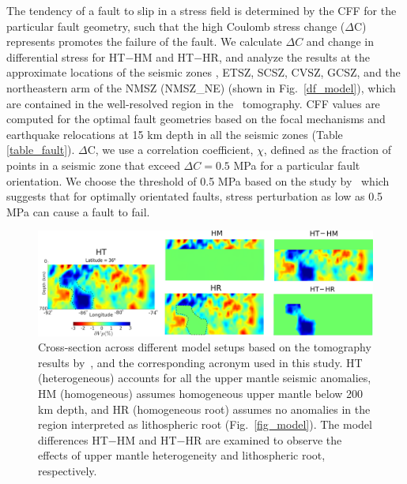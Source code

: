 \documentclass[draft,linenumbers]{agujournal2018}
\begin{document}
The tendency of a fault to slip in a stress field is determined by the CFF for the particular fault geometry, such that the high Coulomb stress change ($\Delta$C) represents promotes the failure of the fault. We calculate $\Delta C$ and change in differential stress for HT$-$HM and HT$-$HR, and analyze the results at the approximate locations of the seismic zones , ETSZ, SCSZ, CVSZ, GCSZ, and the northeastern arm of the NMSZ (NMSZ\_NE) (shown in Fig.~\ref{df_model}), which are contained in the well-resolved region in the~\citet{Biryol_2016} tomography. CFF values are computed for the optimal fault geometries based on the focal mechanisms and earthquake relocations at 15 km depth in all the seismic zones (Table \ref{table_fault}).  $\Delta$C, we use a correlation coefficient, $\chi$, defined as the fraction of points in a seismic zone that exceed $\Delta C = 0.5$ MPa for a particular fault orientation. We choose the threshold of 0.5 MPa based on the study by~\citet{stein1999role} which suggests that for optimally orientated faults, stress perturbation as low as 0.5 MPa can cause a fault to fail.
%
\begin{figure}[h!]
    \centering
    \includegraphics[width=\linewidth]{figures/model_differences.png}
    \caption{Cross-section across different model setups based on the tomography results by~\citep{Biryol_2016}, and the corresponding acronym used in this study. HT (heterogeneous) accounts for all the upper mantle seismic anomalies, HM (homogeneous) assumes homogeneous upper mantle below 200 km depth, and HR (homogeneous root) assumes no anomalies in the region interpreted as lithospheric root (Fig.~\ref{fig_model}). The model differences HT$-$HM and HT$-$HR are examined to observe the effects of upper mantle heterogeneity and lithospheric root, respectively.}
    \label{model_differences}
\end{figure}
%
\end{document}
